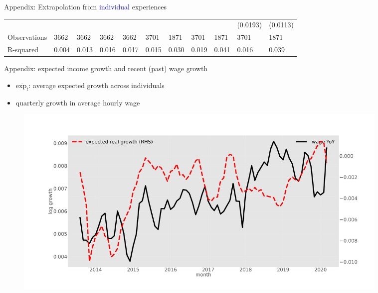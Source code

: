 \documentclass{beamer}
\begin{document}
\begin{frame}{Appendix: Extrapolation from \textcolor{blue}{individual} experiences}
\begin{table}
{\begin{tabular}{lllllllllll}
				&           &           &           &           &            &            &            &            & (0.0193)   & (0.0113)   \\
				Observations                          & 3662      & 3662      & 3662      & 3662      & 3701       & 1871       & 3701       & 1871       & 3701       & 1871       \\
				R-squared                             & 0.004     & 0.013     & 0.016     & 0.017     & 0.015      & 0.030      & 0.019      & 0.041      & 0.016      & 0.039      \\
				\hline 
			\end{tabular}
		}
	\end{table}
\end{frame}



\begin{frame}{Appendix: expected income growth and recent (past) wage growth}
	\label{appendix:tsMean3mvrexp_he}
	\begin{itemize}
		\item $\overline{\text{exp}_{t}} $: average expected growth across individuals
		\item  quarterly growth in average hourly wage
	\end{itemize}
	\begin{figure}
		\centering
		\label{ts_exp}
		\includegraphics[width=0.9\textwidth]{figures/tsMean3mvrexp_he.jpg}
	\end{figure}
	\quad  \hyperlink{tsMean3mvrvar_he}{} 
\end{frame}
\end{document}
